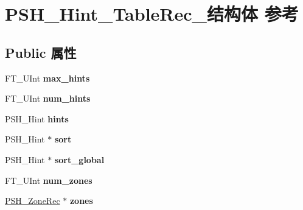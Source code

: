 \hypertarget{struct_p_s_h___hint___table_rec__}{}\section{P\+S\+H\+\_\+\+Hint\+\_\+\+Table\+Rec\+\_\+结构体 参考}
\label{struct_p_s_h___hint___table_rec__}
\subsection*{Public 属性}
\begin{DoxyCompactItemize}
\item 
\mbox{\label{struct_p_s_h___hint___table_rec___a09397cc20944d33d6da97560b619c5ba}} 
F\+T\+\_\+\+U\+Int {\bfseries max\+\_\+hints}
\item 
\mbox{\label{struct_p_s_h___hint___table_rec___a31b4cf8054a137eca471b78b3c743ba4}} 
F\+T\+\_\+\+U\+Int {\bfseries num\+\_\+hints}
\item 
\mbox{\label{struct_p_s_h___hint___table_rec___a845075fb5ed4acc6f024892aa00267e0}} 
P\+S\+H\+\_\+\+Hint {\bfseries hints}
\item 
\mbox{\label{struct_p_s_h___hint___table_rec___aa05b021add8a56a12647d117eedce984}} 
P\+S\+H\+\_\+\+Hint $\ast$ {\bfseries sort}
\item 
\mbox{\label{struct_p_s_h___hint___table_rec___a2420ec7ac759f5463693c3022307ec36}} 
P\+S\+H\+\_\+\+Hint $\ast$ {\bfseries sort\+\_\+global}
\item 
\mbox{\label{struct_p_s_h___hint___table_rec___ae37a665a5533bc85e59d38ad1686039c}} 
F\+T\+\_\+\+U\+Int {\bfseries num\+\_\+zones}
\item 
\mbox{\label{struct_p_s_h___hint___table_rec___a4afc59850494c41579c3251ba215e0f2}} 
\hyperlink{struct_p_s_h___zone_rec__}{P\+S\+H\+\_\+\+Zone\+Rec} $\ast$ {\bfseries zones}
\item 
\mbox{\label{struct_p_s_h___hint___table_rec___afed30407dd9e8da52d1c111987b342a9}} 

\end{DoxyCompactItemize}
